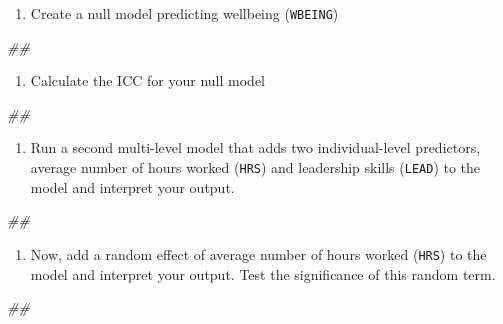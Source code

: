 \documentclass[]{book}
\newenvironment{Shaded}{\begin{snugshade}}{\end{snugshade}}
\newcommand{\CommentTok}[1]{\textcolor[rgb]{0.56,0.35,0.01}{\textit{#1}}}
\providecommand{\tightlist}{%
  \setlength{\itemsep}{0pt}\setlength{\parskip}{0pt}}
\begin{document}
\begin{enumerate}
\def\labelenumi{\arabic{enumi}.}
\tightlist
\item
  Create a null model predicting wellbeing (\texttt{WBEING})
\end{enumerate}

\begin{Shaded}
\begin{Highlighting}[]
\CommentTok{## }
\end{Highlighting}
\end{Shaded}

\begin{enumerate}
\def\labelenumi{\arabic{enumi}.}
\setcounter{enumi}{1}
\tightlist
\item
  Calculate the ICC for your null model
\end{enumerate}

\begin{Shaded}
\begin{Highlighting}[]
\CommentTok{## }
\end{Highlighting}
\end{Shaded}

\begin{enumerate}
\def\labelenumi{\arabic{enumi}.}
\setcounter{enumi}{2}
\tightlist
\item
  Run a second multi-level model that adds two individual-level predictors, average number of hours worked (\texttt{HRS}) and leadership skills (\texttt{LEAD}) to the model and interpret your output.
\end{enumerate}

\begin{Shaded}
\begin{Highlighting}[]
\CommentTok{## }
\end{Highlighting}
\end{Shaded}

\begin{enumerate}
\def\labelenumi{\arabic{enumi}.}
\setcounter{enumi}{3}
\tightlist
\item
  Now, add a random effect of average number of hours worked (\texttt{HRS}) to the model and interpret your output. Test the significance of this random term.
\end{enumerate}

\begin{Shaded}
\begin{Highlighting}[]
\CommentTok{## }
\end{Highlighting}
\end{Shaded}
\end{document}
